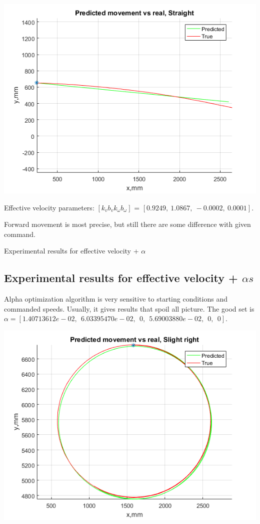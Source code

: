 \documentclass[a4paper, 12pt]{article}
\begin{document}
\includegraphics[scale = 0.8]{se.png}

Effective velocity parameters: $[k_v b_v k_{\omega} b_{\omega}]$ = $[0.9249,~    1.0867,~   -0.0002,~    0.0001]$.

Forward movement is most precise, but still there are some difference with given command.

Experimental results for effective velocity + $\alpha $

\subsection{Experimental results for effective velocity + $\alpha s$}

Alpha optimization algorithm is very sensitive to starting conditions and commanded speeds. Usually, it gives results that spoil all picture. The good set is $\alpha =  [1.40713612e-02,~~   6.03395470e-02,~~   0,~~   5.69003880e-02,~~   0,~~   0]$.

\includegraphics[scale = 0.8]{ra.png}
\end{document}
